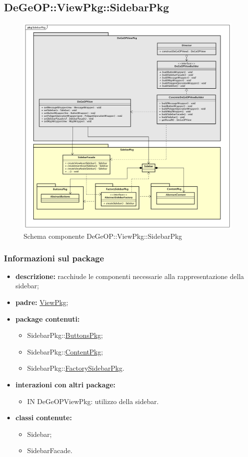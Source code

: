 \subsection{DeGeOP::ViewPkg::SidebarPkg}
\label{pkg::SidebarPkg}
\begin{figure}[H]
	\centering
	\includegraphics[width=\textwidth]{img/PkgDiagram/SidebarPkg.png}
	\caption{Schema componente DeGeOP::ViewPkg::SidebarPkg}
\end{figure}
\subsubsection{Informazioni sul package}
\begin{itemize}
	\item \textbf{descrizione:} racchiude le componenti necessarie alla rappresentazione della sidebar;
	\item \textbf{padre:} \hyperref[pkg::ViewPkg]{ViewPkg};
	\item \textbf{package contenuti:}
	\begin{itemize}
		\item SidebarPkg::\hyperref[pkg::ButtonsPkg]{ButtonsPkg};
		\item SidebarPkg::\hyperref[pkg::ContentPkg]{ContentPkg};
		\item SidebarPkg::\hyperref[pkg::FactorySidebarPkg]{FactorySidebarPkg}.
	\end{itemize}
	\item \textbf{interazioni con altri package:} 
	\begin{itemize}
		\item IN DeGeOPViewPkg: utilizzo della sidebar.
	\end{itemize}
	\item \textbf{classi contenute:}
	\begin{itemize}
		\item Sidebar;
		\item SidebarFacade.
	\end{itemize}
\end{itemize}
